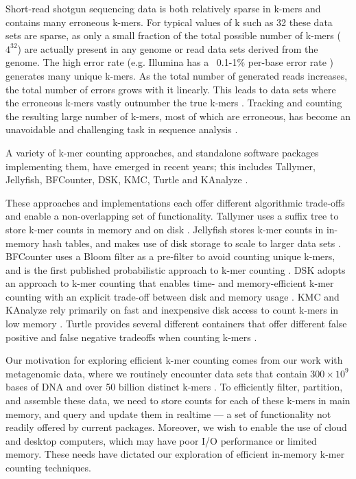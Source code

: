 \documentclass[10pt]{article}
\begin{document}

Short-read shotgun sequencing data is both relatively sparse in k-mers
and contains many erroneous k-mers.  For typical values of k such as
32 these data sets are sparse, as only a small fraction of the total
possible number of k-mers ($4^{32}$) are actually present in any
genome or read data sets derived from the genome.  The high error rate
(e.g. Illumina has a ~0.1-1\% per-base error rate
\cite{pubmed19997069}) generates many unique k-mers.  As the total
number of generated reads increases, the total number of errors grows
with it linearly. This leads to data sets where the erroneous k-mers
vastly outnumber the true k-mers \cite{Conway2011}.  Tracking and
counting the resulting large number of k-mers, most of which are
erroneous, has become an unavoidable and challenging task in sequence
analysis \cite{Minoche2011}.

A variety of k-mer counting approaches, and standalone software
packages implementing them, have emerged in recent years; this
includes Tallymer, Jellyfish, BFCounter, DSK, KMC, Turtle and KAnalyze
\cite{Kurtz2008, Marcais2011, Melsted2011, Rizk2013, Deorowicz2013,
  Roy2014, Audano2014}.

These approaches and implementations each offer different algorithmic
trade-offs and enable a non-overlapping set of functionality.
Tallymer uses a suffix tree to store k-mer counts in memory and on
disk \cite{Kurtz2008}.  Jellyfish stores k-mer counts in in-memory
hash tables, and makes use of disk storage to scale to larger data
sets \cite{Marcais2011}.  BFCounter uses a Bloom filter as a
pre-filter to avoid counting unique k-mers, and is the first published
probabilistic approach to k-mer counting \cite{Melsted2011}.  DSK
adopts an
approach to k-mer counting that enables time- and
memory-efficient k-mer counting with an explicit trade-off between
disk and memory usage \cite{Rizk2013}.  KMC and KAnalyze rely
primarily on fast and inexpensive disk access to count k-mers in low
memory \cite{Deorowicz2013,Audano2014}.  Turtle provides several
different containers that offer different false positive and false
negative tradeoffs when counting k-mers \cite{Roy2014}.

Our motivation for exploring efficient k-mer counting comes from our
work with metagenomic data, where we routinely encounter data sets
that contain $300 \times 10^9$ bases of DNA and over 50 billion
distinct k-mers \cite{Howe2012}.  To efficiently filter, partition,
and assemble these data, we need to store counts for each of these
k-mers in main memory, and query and update them in realtime --- a set
of functionality not readily offered by current packages.  Moreover,
we wish to enable the use of cloud and desktop computers, which may
have poor I/O performance or limited memory. These needs have dictated
our exploration of efficient in-memory k-mer counting techniques.
\end{document}
